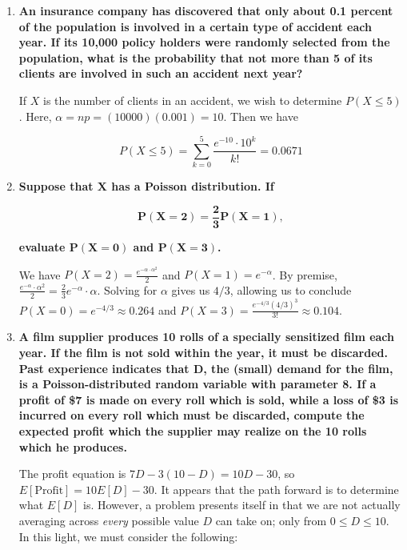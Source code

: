 \documentclass[10pt, oneside]{article}
\begin{document}
\begin{enumerate}[label=8.\arabic*]
\item  \begin{tcolorbox}[
  colback=Cerulean!5!white,
  colframe=Cerulean!75!black]
\textbf{An insurance company has discovered that only about 0.1 percent of the population is involved in a certain type of accident each year. If its 10,000 policy holders were randomly selected from the population, what is the probability that not more than 5 of its clients are involved in such an accident next year?}
\end{tcolorbox}

If $X$ is the number of clients in an accident, we wish to determine $P(X \leq 5)$. Here, $\alpha = np = (10000)(0.001) = 10$. Then we have

\[ P(X \leq 5) = \sum^5_{k = 0} \frac{e^{-10} \cdot 10^k}{k!} = \boxed{0.0671} \]

\item  \begin{tcolorbox}[
  colback=Cerulean!5!white,
  colframe=Cerulean!75!black]
\textbf{Suppose that $\bm{X}$ has a Poisson distribution. If}

\[ \bm{P(X = 2) = \frac{2}{3} P(X = 1),} \]

\textbf{evaluate $\bm{P(X = 0)}$ and $\bm{P(X = 3)}$.}
\end{tcolorbox}

We have $P(X = 2) = \frac{e^{-\alpha \cdot \alpha^2}}{2}$ and $P(X = 1) = e^{-\alpha}$. By premise, $\frac{e^{-\alpha} \cdot \alpha^2}{2} = \frac{2}{3} e^{-\alpha} \cdot \alpha$. Solving for $\alpha$ gives us $4/3$, allowing us to conclude $P(X = 0) = e^{-4/3} \approx \boxed{0.264}$ and $P(X = 3) = \frac{e^{-4/3} (4/3)^3}{3!} \approx \boxed{0.104}$.

\item  \begin{tcolorbox}[
  colback=Cerulean!5!white,
  colframe=Cerulean!75!black]
\textbf{A film supplier produces 10 rolls of a specially sensitized film each year. If the film is not sold within the year, it must be discarded. Past experience indicates that $\bm{D}$, the (small) demand for the film, is a Poisson-distributed random variable with parameter 8. If a profit of \$7 is made on every roll which is sold, while a loss of \$3 is incurred on every roll which must be discarded, compute the expected profit which the supplier may realize on the 10 rolls which he produces.}
\end{tcolorbox}

The profit equation is $7D - 3(10 - D) = 10D - 30$, so $E[\text{Profit}] = 10 E[D] - 30$. It appears that the path forward is to determine what $E[D]$ is. However, a problem presents itself in that we are not actually averaging across \textit{every} possible value $D$ can take on; only from $0 \leq D \leq 10$. In this light, we must consider the following:


\end{enumerate}
\end{document}
